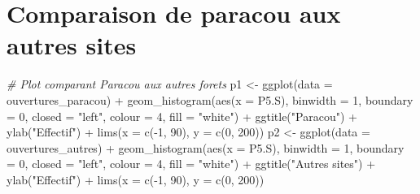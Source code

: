 \documentclass[
  12pt,
  american,
  a4paper,
  extrafontsizes,onecolumn,openright
  ]{memoir}
\newenvironment{Shaded}{\begin{snugshade}}{\end{snugshade}}
\newcommand{\AttributeTok}[1]{\textcolor[rgb]{0.77,0.63,0.00}{#1}}
\newcommand{\CommentTok}[1]{\textcolor[rgb]{0.56,0.35,0.01}{\textit{#1}}}
\newcommand{\DecValTok}[1]{\textcolor[rgb]{0.00,0.00,0.81}{#1}}
\newcommand{\FunctionTok}[1]{\textcolor[rgb]{0.00,0.00,0.00}{#1}}
\newcommand{\NormalTok}[1]{#1}
\newcommand{\OtherTok}[1]{\textcolor[rgb]{0.56,0.35,0.01}{#1}}
\newcommand{\SpecialCharTok}[1]{\textcolor[rgb]{0.00,0.00,0.00}{#1}}
\newcommand{\StringTok}[1]{\textcolor[rgb]{0.31,0.60,0.02}{#1}}
\begin{document}
\normalsize

\hypertarget{comparaison-de-paracou-aux-autres-sites}{%
\section{Comparaison de paracou aux autres sites}\label{comparaison-de-paracou-aux-autres-sites}}

\scriptsize

\begin{Shaded}
\begin{Highlighting}[]
\CommentTok{\# Plot comparant Paracou aux autres forets}
\NormalTok{p1 }\OtherTok{\textless{}{-}} \FunctionTok{ggplot}\NormalTok{(}\AttributeTok{data =}\NormalTok{ ouvertures\_paracou) }\SpecialCharTok{+} \FunctionTok{geom\_histogram}\NormalTok{(}\FunctionTok{aes}\NormalTok{(}\AttributeTok{x =}\NormalTok{ P5.S),}
    \AttributeTok{binwidth =} \DecValTok{1}\NormalTok{, }\AttributeTok{boundary =} \DecValTok{0}\NormalTok{, }\AttributeTok{closed =} \StringTok{"left"}\NormalTok{, }\AttributeTok{colour =} \DecValTok{4}\NormalTok{,}
    \AttributeTok{fill =} \StringTok{"white"}\NormalTok{) }\SpecialCharTok{+} \FunctionTok{ggtitle}\NormalTok{(}\StringTok{"Paracou"}\NormalTok{) }\SpecialCharTok{+} \FunctionTok{ylab}\NormalTok{(}\StringTok{"Effectif"}\NormalTok{) }\SpecialCharTok{+}
    \FunctionTok{lims}\NormalTok{(}\AttributeTok{x =} \FunctionTok{c}\NormalTok{(}\SpecialCharTok{{-}}\DecValTok{1}\NormalTok{, }\DecValTok{90}\NormalTok{), }\AttributeTok{y =} \FunctionTok{c}\NormalTok{(}\DecValTok{0}\NormalTok{, }\DecValTok{200}\NormalTok{))}
\NormalTok{p2 }\OtherTok{\textless{}{-}} \FunctionTok{ggplot}\NormalTok{(}\AttributeTok{data =}\NormalTok{ ouvertures\_autres) }\SpecialCharTok{+} \FunctionTok{geom\_histogram}\NormalTok{(}\FunctionTok{aes}\NormalTok{(}\AttributeTok{x =}\NormalTok{ P5.S),}
    \AttributeTok{binwidth =} \DecValTok{1}\NormalTok{, }\AttributeTok{boundary =} \DecValTok{0}\NormalTok{, }\AttributeTok{closed =} \StringTok{"left"}\NormalTok{, }\AttributeTok{colour =} \DecValTok{4}\NormalTok{,}
    \AttributeTok{fill =} \StringTok{"white"}\NormalTok{) }\SpecialCharTok{+} \FunctionTok{ggtitle}\NormalTok{(}\StringTok{"Autres sites"}\NormalTok{) }\SpecialCharTok{+} \FunctionTok{ylab}\NormalTok{(}\StringTok{"Effectif"}\NormalTok{) }\SpecialCharTok{+}
    \FunctionTok{lims}\NormalTok{(}\AttributeTok{x =} \FunctionTok{c}\NormalTok{(}\SpecialCharTok{{-}}\DecValTok{1}\NormalTok{, }\DecValTok{90}\NormalTok{), }\AttributeTok{y =} \FunctionTok{c}\NormalTok{(}\DecValTok{0}\NormalTok{, }\DecValTok{200}\NormalTok{))}

\end{Highlighting}
\end{Shaded}
\end{document}
